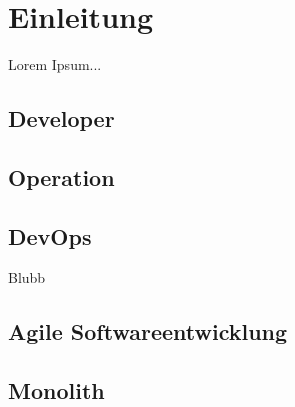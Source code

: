 \chapter{Einleitung}
Lorem Ipsum...

\section{Developer}

\section{Operation}

\section{DevOps}
Blubb

\section{Agile Softwareentwicklung}

\section{Monolith}
